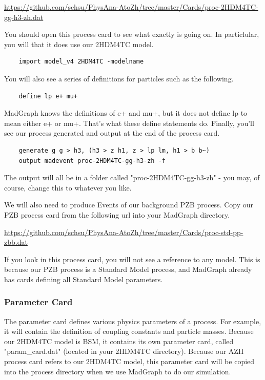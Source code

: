 \documentclass{article}
\begin{document}
\bigskip

\url{https://github.com/schsu/PhysAna-AtoZh/tree/master/Cards/proc-2HDM4TC-gg-h3-zh.dat}

\bigskip

You should open this process card to see what exactly is going on. In particlular, you will that it does use our 2HDM4TC model.

\begin{verbatim}
	import model_v4 2HDM4TC -modelname
\end{verbatim}

You will also see a series of definitions for particles such as the following.

\begin{verbatim}
	define lp e+ mu+
\end{verbatim}

MadGraph knows the definitions of e+ and mu+, but it does not define lp to mean either e+ or mu+.
That's what these define statements do. Finally, you'll see our process generated and output at
the end of the process card.

\begin{verbatim}
	generate g g > h3, (h3 > z h1, z > lp lm, h1 > b b~)
	output madevent proc-2HDM4TC-gg-h3-zh -f
\end{verbatim}

The output will all be in a folder called "proc-2HDM4TC-gg-h3-zh" - you may, of course, change this to whatever you like.

\bigskip

We will also need to produce Events of our background PZB process. Copy our PZB process card
from the following url into your MadGraph directory.

\bigskip

\url{https://github.com/schsu/PhysAna-AtoZh/tree/master/Cards/proc-std-pp-zbb.dat}

\bigskip

If you look in this process card, you will not see a reference to any model. This is because
our PZB process is a Standard Model process, and MadGraph already has cards defining all Standard Model parameters.

\subsubsection{Parameter Card}

The parameter card defines various physics parameters of a process. For example, it will contain the definition of coupling
constants and particle masses. Because our 2HDM4TC model is BSM, it contains its own parameter card, called "param\_card.dat" (located in your 2HDM4TC directory).
Because our AZH process card refers to our 2HDM4TC model, this parameter card will be copied into the process directory when
we use MadGraph to do our simulation.
\end{document}
